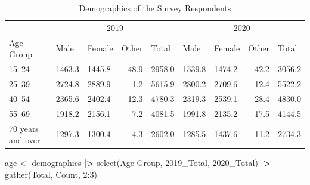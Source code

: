 \documentclass[
]{article}
\newenvironment{Shaded}{\begin{snugshade}}{\end{snugshade}}
\newcommand{\AttributeTok}[1]{\textcolor[rgb]{0.77,0.63,0.00}{#1}}
\newcommand{\DecValTok}[1]{\textcolor[rgb]{0.00,0.00,0.81}{#1}}
\newcommand{\ErrorTok}[1]{\textcolor[rgb]{0.64,0.00,0.00}{\textbf{#1}}}
\newcommand{\FunctionTok}[1]{\textcolor[rgb]{0.00,0.00,0.00}{#1}}
\newcommand{\NormalTok}[1]{#1}
\newcommand{\OtherTok}[1]{\textcolor[rgb]{0.56,0.35,0.01}{#1}}
\newcommand{\SpecialCharTok}[1]{\textcolor[rgb]{0.00,0.00,0.00}{#1}}
\newcommand{\StringTok}[1]{\textcolor[rgb]{0.31,0.60,0.02}{#1}}
\begin{document}
\begin{table}

\caption{\label{tab:unnamed-chunk-4}Demographics of the Survey Respondents}
\centering
\begin{tabular}[t]{lllrlllrl}
\toprule
\multicolumn{1}{c}{ } & \multicolumn{4}{c}{2019} & \multicolumn{4}{c}{2020} \\
\cmidrule(l{3pt}r{3pt}){2-5} \cmidrule(l{3pt}r{3pt}){6-9}
Age Group & Male & Female & Other & Total & Male & Female & Other & Total\\
\midrule
15–24 & 1463.3 & 1445.8 & 48.9 & 2958.0 & 1539.8 & 1474.2 & 42.2 & 3056.2\\
25–39 & 2724.8 & 2889.9 & 1.2 & 5615.9 & 2800.2 & 2709.6 & 12.4 & 5522.2\\
40–54 & 2365.6 & 2402.4 & 12.3 & 4780.3 & 2319.3 & 2539.1 & -28.4 & 4830.0\\
55–69 & 1918.2 & 2156.1 & 7.2 & 4081.5 & 1991.8 & 2135.2 & 17.5 & 4144.5\\
70 years and over & 1297.3 & 1300.4 & 4.3 & 2602.0 & 1285.5 & 1437.6 & 11.2 & 2734.3\\
\bottomrule
\end{tabular}
\end{table}

\begin{Shaded}
\begin{Highlighting}[]
\NormalTok{age }\OtherTok{\textless{}{-}} 
\NormalTok{  demographics }\SpecialCharTok{|}\ErrorTok{\textgreater{}}
  \FunctionTok{select}\NormalTok{(}\StringTok{\textasciigrave{}}\AttributeTok{Age Group}\StringTok{\textasciigrave{}}\NormalTok{, }\StringTok{\textasciigrave{}}\AttributeTok{2019\_Total}\StringTok{\textasciigrave{}}\NormalTok{, }\StringTok{\textasciigrave{}}\AttributeTok{2020\_Total}\StringTok{\textasciigrave{}}\NormalTok{) }\SpecialCharTok{|}\ErrorTok{\textgreater{}}
  \FunctionTok{gather}\NormalTok{(Total, Count, }\DecValTok{2}\SpecialCharTok{:}\DecValTok{3}\NormalTok{)}
\end{Highlighting}
\end{Shaded}
\end{document}
